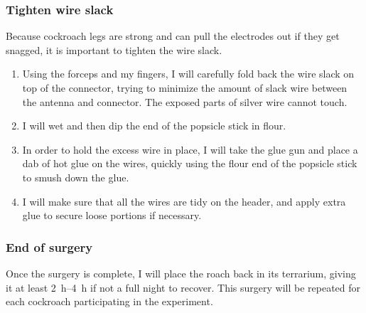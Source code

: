\subsubsection{Tighten wire slack}
Because cockroach legs are strong and can pull the electrodes out if they get snagged, it is important to tighten the wire slack. 
\begin{enumerate}
    \item Using the forceps and my fingers, I will carefully fold back the wire slack on top of the connector, trying to minimize the amount of slack wire between the antenna and connector. The exposed parts of silver wire cannot touch.
    \item I will wet and then dip the end of the popsicle stick in flour.
    \item In order to hold the excess wire in place, I will take the glue gun and place a dab of hot glue on the wires, quickly using the flour end of the popsicle stick to smush down the glue.
    \item I will make sure that all the wires are tidy on the header, and apply extra glue to secure loose portions if necessary.
\end{enumerate}

\subsubsection{End of surgery}
Once the surgery is complete, I will place the roach back in its terrarium, giving it at least \SIrange{2}{4}{\hour} if not a full night to recover. This surgery will be repeated for each cockroach participating in the experiment.

